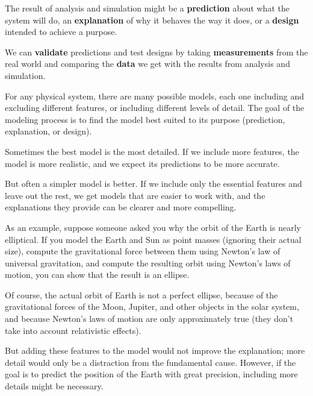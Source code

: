 \documentclass[
]{book}
\numberwithin{Answer}{chapter}
\numberwithin{Exercise}{chapter}
\begin{document}

The result of analysis and simulation might be a {\bf prediction} about what the system will do, an {\bf explanation} of why it behaves the way it does, or a {\bf design} intended to achieve a purpose.


We can {\bf validate} predictions and test designs by taking {\bf measurements} from the real world and comparing the {\bf data} we get with the results from analysis and simulation. 


For any physical system, there are many possible models, each one including and excluding different features, or including different levels of detail.  The goal of the modeling process is to find the model best suited to its purpose (prediction, explanation, or design).


Sometimes the best model is the most detailed.  If we include more features, the model is more realistic, and we expect its predictions to be more accurate.


But often a simpler model is better.  If we include only the essential features and leave out the rest, we get models that are easier to work with, and the explanations they provide can be clearer and more compelling.


As an example, suppose someone asked you why the orbit of the Earth is nearly elliptical.  If you model the Earth and Sun as point masses (ignoring their actual size), compute the gravitational force between them using Newton's law of universal gravitation, and compute the resulting orbit using Newton's laws of motion, you can show that the result is an ellipse.


Of course, the actual orbit of Earth is not a perfect ellipse, because of the gravitational forces of the Moon, Jupiter, and other objects in the solar system, and because Newton's laws of motion are only approximately true (they don't take into account relativistic effects).


But adding these features to the model would not improve the explanation; more detail would only be a distraction from the fundamental cause.  However, if the goal is to predict the position of the Earth with great precision, including more details might be necessary.  
\end{document}

